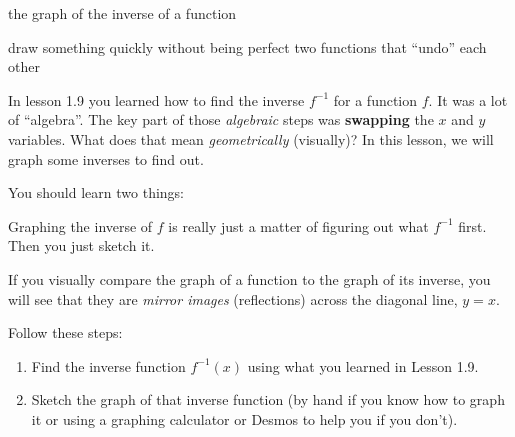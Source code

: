 \documentclass[fleqn,letterpaper,12pt,printwatermark=false]{memoir}
\begin{document}
\newcommand{\myClassName}{Pre-AP Algebra 2}
\newcommand{\myUnitNumber}{1}
\newcommand{\myUnitTitle}{Introduction to Functions}
\newcommand{\myLessonNumber}{10}
\newcommand{\myLessonTitle}{Sketching Inverses}



\pagestyle{myPagestyle}

\checkandfixthelayout
{}

\begin{myNotesHeader}
    \item {} the graph of the inverse of a function
\end{myNotesHeader}

\begin{myVocabulary}
        {
            draw something quickly without being perfect
        }
        {
            two functions that ``undo'' each other
        }
\end{myVocabulary}

\begin{myLesson}
    In lesson 1.9 you learned how to find the inverse $f^{-1}$ 
    for a function $f$.
    It was a lot of ``algebra''.
    The key part of those \emph{algebraic} steps was {\bfseries swapping} 
    the $x$ and $y$ variables. 
    What does that mean \emph{geometrically} (visually)?
    In this lesson, we will graph some inverses to find out.

    You should learn two things:

    \begin{myLessonBox}
        Graphing the inverse of $f$ is really just a matter 
        of figuring out what $f^{-1}$ first. 
        Then you just sketch it.
    \end{myLessonBox}

    \begin{myLessonBox}
        If you visually compare the graph of a function
        to the graph of its inverse,
        you will see that they are \emph{mirror images} (reflections)
        across the diagonal line, $y=x$.
    \end{myLessonBox}
\end{myLesson}

\begin{myKeyConcepts}
    Follow these steps:
    \begin{enumerate}
        \item Find the inverse function $f^{-1}(x)$ using what you learned in Lesson 1.9.
        \item Sketch the graph of that inverse function 
        (by hand if you know how to graph it or using a graphing calculator or Desmos to help you if you don't).
    \end{enumerate}
\end{myKeyConcepts}
\end{document}
